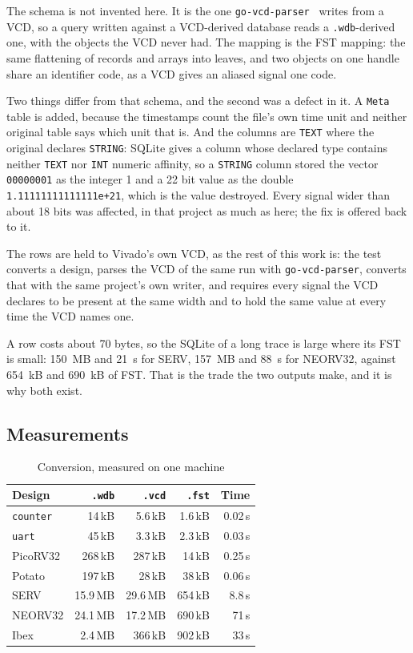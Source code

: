 The schema is not invented here. It is the one
\texttt{go-vcd-parser}~\cite{govcd} writes from a VCD, so a query
written against a VCD-derived database reads a
\texttt{.wdb}-derived one, with the objects the VCD never had. The
mapping is the FST mapping: the same flattening of records and arrays
into leaves, and two objects on one handle share an identifier code,
as a VCD gives an aliased signal one code.

Two things differ from that schema, and the second was a defect in it.
A \texttt{Meta} table is added, because the timestamps count the
file's own time unit and neither original table says which unit that
is. And the columns are \texttt{TEXT} where the original declares
\texttt{STRING}: SQLite gives a column whose declared type contains
neither \texttt{TEXT} nor \texttt{INT} numeric affinity, so a
\texttt{STRING} column stored the vector \texttt{00000001} as the
integer 1 and a 22 bit value as the double
\texttt{1.11111111111111e+21}, which is the value destroyed. Every
signal wider than about 18 bits was affected, in that project as much
as here; the fix is offered back to it.

The rows are held to Vivado's own VCD, as the rest of this work is:
the test converts a design, parses the VCD of the same run with
\texttt{go-vcd-parser}, converts that with the same project's own
writer, and requires every signal the VCD declares to be present at
the same width and to hold the same value at every time the VCD names
one.

A row costs about 70 bytes, so the SQLite of a long trace is large
where its FST is small: 150~MB and 21~s for SERV, 157~MB and 88~s for
NEORV32, against 654~kB and 690~kB of FST. That is the trade the two
outputs make, and it is why both exist.

\subsection{Measurements}

\begin{table}[t]
\caption{Conversion, measured on one machine}
\label{tab:cost}
\centering
\begin{tabular}{lrrrr}
\toprule
Design & \texttt{.wdb} & \texttt{.vcd} & \texttt{.fst} & Time \\
\midrule
\texttt{counter} & 14\,kB & 5.6\,kB & 1.6\,kB & 0.02\,s \\
\texttt{uart} & 45\,kB & 3.3\,kB & 2.3\,kB & 0.03\,s \\
PicoRV32 & 268\,kB & 287\,kB & 14\,kB & 0.25\,s \\
Potato & 197\,kB & 28\,kB & 38\,kB & 0.06\,s \\
SERV & 15.9\,MB & 29.6\,MB & 654\,kB & 8.8\,s \\
NEORV32 & 24.1\,MB & 17.2\,MB & 690\,kB & 71\,s \\
Ibex & 2.4\,MB & 366\,kB & 902\,kB & 33\,s \\
\bottomrule
\end{tabular}
\end{table}

